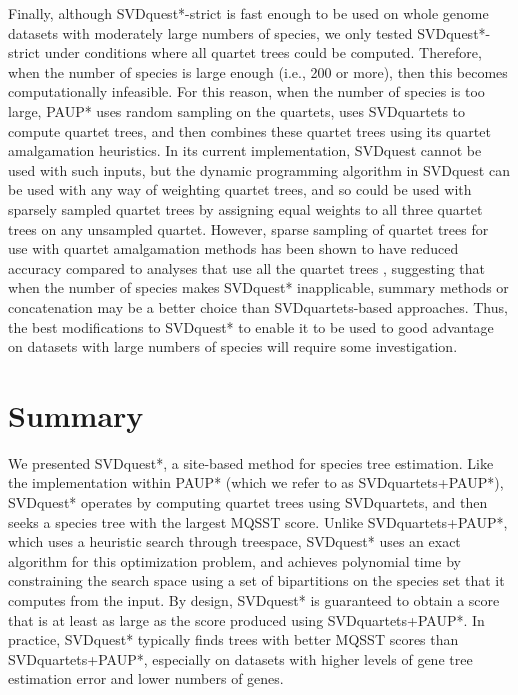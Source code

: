 Finally, although SVDquest*-strict is fast enough to be used on 
whole genome datasets with moderately large numbers of species, we only tested SVDquest*-strict under conditions where
all quartet trees could be computed.
Therefore, when the number of species is large enough (i.e., 200 or more), then this becomes computationally infeasible.
For this reason, when the number of species is too large, PAUP* uses random sampling on the quartets, uses SVDquartets to compute quartet trees, and then
combines these quartet trees using its quartet amalgamation heuristics. 
In its current implementation, 
SVDquest cannot be used with such inputs, but 
the dynamic programming algorithm  in SVDquest  can be used with any way of weighting quartet trees, and so could be used with sparsely sampled quartet trees by assigning
equal weights to all three quartet trees on any unsampled quartet. 
However, sparse sampling of quartet trees for use with quartet amalgamation methods has been shown to have reduced
accuracy compared to analyses that use all the quartet trees \cite{Swenson2011}, suggesting that when the number of species makes SVDquest* inapplicable, 
summary methods or concatenation may be a better choice than SVDquartets-based approaches.
Thus, the best modifications to SVDquest* to enable it to be used to good advantage on datasets with large numbers of species will
require some investigation. 
 



\section{Summary}


We presented SVDquest*, a site-based
method for species tree estimation.
Like the implementation within PAUP* (which we
refer to as SVDquartets+PAUP*), SVDquest* operates by
computing quartet trees using SVDquartets, and
then seeks a species tree with 
the largest  MQSST  score.  Unlike
SVDquartets+PAUP*, which uses a heuristic
search through treespace, 
SVDquest* uses an exact algorithm for this optimization
problem, and achieves polynomial time by constraining the search
space using a set of bipartitions on the species set that it
computes from the input. 
By design, SVDquest* is
guaranteed to obtain a score that is at least as  large
as the score 
produced using SVDquartets+PAUP*. 
In practice, SVDquest* typically finds
trees with better MQSST scores than SVDquartets+PAUP*, especially on datasets with
higher levels of  gene tree
estimation error and lower numbers of genes. 




